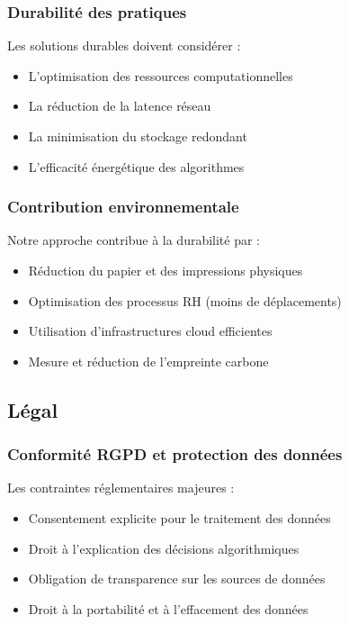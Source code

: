 \documentclass[12pt,a4paper]{report}
\begin{document}
\subsubsection{Durabilité des pratiques}

Les solutions durables doivent considérer :
\begin{itemize}
\item L'optimisation des ressources computationnelles
\item La réduction de la latence réseau
\item La minimisation du stockage redondant
\item L'efficacité énergétique des algorithmes
\end{itemize}

\subsubsection{Contribution environnementale}

Notre approche contribue à la durabilité par :
\begin{itemize}
\item Réduction du papier et des impressions physiques
\item Optimisation des processus RH (moins de déplacements)
\item Utilisation d'infrastructures cloud efficientes
\item Mesure et réduction de l'empreinte carbone
\end{itemize}

\subsection{Légal}

\subsubsection{Conformité RGPD et protection des données}

Les contraintes réglementaires majeures :
\begin{itemize}
\item Consentement explicite pour le traitement des données
\item Droit à l'explication des décisions algorithmiques
\item Obligation de transparence sur les sources de données
\item Droit à la portabilité et à l'effacement des données
\end{itemize}
\end{document}
